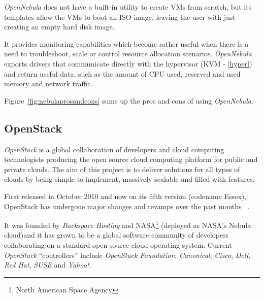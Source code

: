 
\textit{OpenNebula} does not have a built-in utility to create VMs from scratch, but its templates allow the VMs to boot an ISO image, leaving the user with just creating an empty hard disk image.

It provides monitoring capabilities which become rather useful when there is a need to troubleshoot, scale or control resource allocation scenarios. \textit{OpenNebula} exports drivers that communicate directly with the hypervisor (KVM - \ref{hyper}) and return useful data, such as the amount of CPU used, reserved and used memory and network traffic.\cite{open-clouds}

Figure~\ref{fig:nebulaprosandcons} sums up the pros and cons of using \textit{OpenNebula}.


\subsection{OpenStack}\label{openstack}

\textit{OpenStack} is a global collaboration of developers and cloud computing technologists producing the open source cloud computing platform for public and private clouds. The aim of this project is to deliver solutions for all types of clouds by being simple to implement, massively scalable and filled with features. 

First released in October 2010 and now on its fifth version (codename Essex), OpenStack has undergone major changes and revamps over the past months ~\cite{openstack}.

It was founded by \textit{Rackspace Hosting} and NASA\footnote{North American Space Agency} (deployed as NASA's Nebula cloud\cite{needs cite})and it has grown to be a global software community of developers collaborating on a standard open source cloud operating system. Current \textit{OpenStack} ``controllers'' include \textit{OpenStack Foundation}, \textit{Canonical}, \textit{Cisco}, \textit{Dell}, \textit{Red Hat}, \textit{SUSE} and \textit{Yahoo!}. \cite{https://github.com/dellcloudedge/crowbar/wiki/OpenStack-Essex-Deploy-Day}

